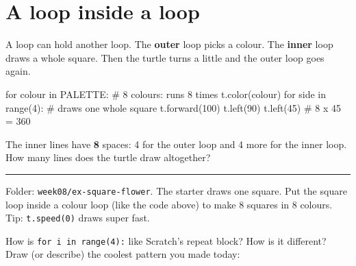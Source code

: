 \section{A loop inside a loop}
A loop can hold another loop. The \textbf{outer} loop picks a colour. The \textbf{inner} loop draws a whole square. Then the turtle turns a little and the outer loop goes again.
\begin{pycode}
for colour in PALETTE:          # 8 colours: runs 8 times
    t.color(colour)
    for side in range(4):       # draws one whole square
        t.forward(100)
        t.left(90)
    t.left(45)                  # 8 x 45 = 360
\end{pycode}
The inner lines have \textbf{8} spaces: 4 for the outer loop and 4 more for the inner loop. How many lines does the turtle draw altogether? \rule{1.5cm}{0.4pt}

\begin{exercise}
Folder: \texttt{week08/ex-square-flower}. The starter draws one square. Put the square loop inside a colour loop (like the code above) to make 8 squares in 8 colours. Tip: \texttt{t.speed(0)} draws super fast.
\end{exercise}


\begin{vocab}
\end{vocab}

\begin{reflection}
How is \texttt{for i in range(4):} like Scratch's repeat block? How is it different?
Draw (or describe) the coolest pattern you made today:
\answerspace{3cm}
\end{reflection}
